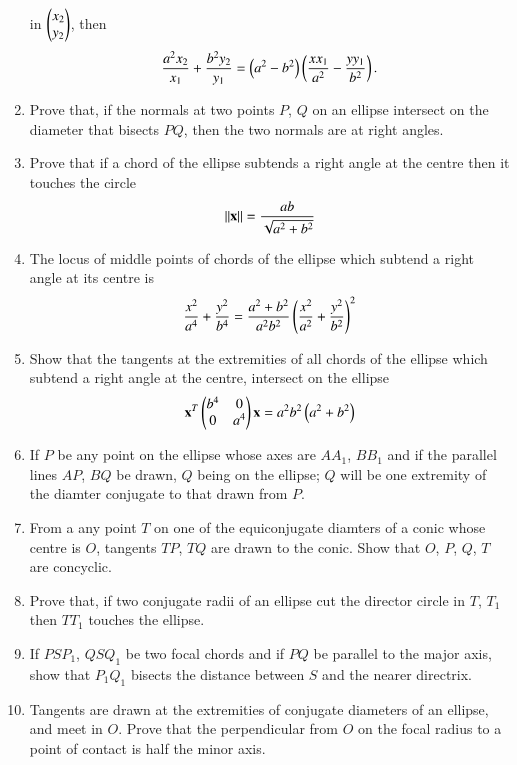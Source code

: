 \begin{enumerate}[label=\arabic*.,ref=\thesubsection.\theenumi]
in $\begin{pmatrix}x_2\\y_2\end{pmatrix}$, then
\begin{align}
\frac{a^2x_2}{x_1}+\frac{b^2y_2}{y_1}=\left(a^2-b^2\right)\left(\frac{xx_1}{a^2}-\frac{yy_1}{b^2}\right).
\end{align}
\item Prove that, if the normals at two points $P$, $Q$ on an ellipse intersect on the diameter
that bisects $PQ$, then the two normals are at right angles.
\item Prove that if a chord of the ellipse subtends a right angle at the centre
then it touches the circle
\begin{align}
\left\lVert\mathbf{x}\right\rVert = \frac{ab}{\sqrt{a^2+b^2}}
\end{align}
\item The locus of middle points of chords of the ellipse which subtend a right angle at its centre is
\begin{align}
\frac{x^2}{a^4}+\frac{y^2}{b^4}=\frac{a^2+b^2}{a^2b^2}\left(\frac{x^2}{a^2}+\frac{y^2}{b^2}\right)^2
\end{align}
\item Show that the tangents at the extremities of all chords of the
ellipse which subtend a right angle at the centre, intersect on the ellipse
\begin{align}
\mathbf{x}^T\begin{pmatrix}b^4 & 0\\0 & a^4\end{pmatrix}\mathbf{x} =a^2b^2\left(a^2+b^2\right)
\end{align}
\item If $P$ be any point on the ellipse whose axes are $AA_1$, $BB_1$ and if the parallel lines
$AP$, $BQ$ be drawn, $Q$ being on the ellipse; $Q$ will be one
extremity of the diamter conjugate to that drawn from $P$.
\item From a any point $T$ on one of the equiconjugate diamters of a conic whose centre is $O$, tangents $TP$, $TQ$ are drawn to 
the conic.  Show that $O$, $P$, $Q$, $T$ are concyclic.
\item Prove that, if two conjugate radii of an ellipse cut the
director circle in $T$, $T_1$ then $TT_1$ touches the ellipse.
\item If $PSP_1$, $QSQ_1$ be two focal chords and if $PQ$ be parallel to the major axis, show that $P_1Q_1$ bisects the distance
between $S$ and the nearer directrix.
\item Tangents are drawn at the extremities of conjugate diameters of an ellipse, and meet in $O$.  Prove that the
perpendicular from $O$ on the focal radius to a point of contact is half the
minor axis.

\end{enumerate}
